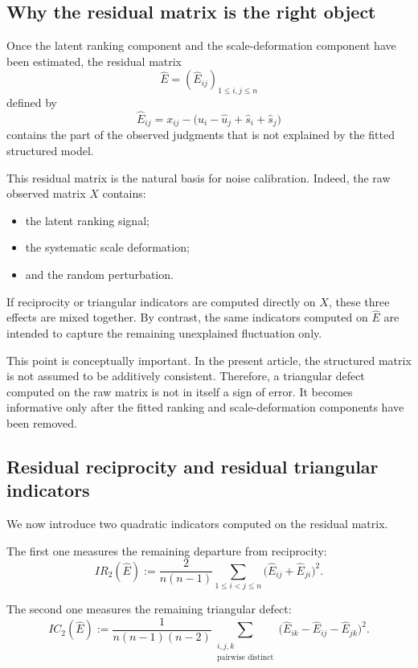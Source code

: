 \documentclass[11pt]{amsart}
\theoremstyle{definition}
\theoremstyle{plain}
\numberwithin{equation}{section}
\begin{document}
\subsection{Why the residual matrix is the right object}

Once the latent ranking component and the scale-deformation component have been estimated, the residual matrix
\[
\widehat E=(\widehat E_{ij})_{1\leq i,j\leq n}
\]
defined by
\[
\widehat E_{ij}
=
x_{ij}
-
\bigl(\widehat u_i-\widehat u_j+\widehat s_i+\widehat s_j\bigr)
\]
contains the part of the observed judgments that is not explained by the fitted structured model.

This residual matrix is the natural basis for noise calibration. Indeed, the raw observed matrix $X$ contains:
\begin{itemize}
\item the latent ranking signal;
\item the systematic scale deformation;
\item and the random perturbation.
\end{itemize}
If reciprocity or triangular indicators are computed directly on $X$, these three effects are mixed together. By contrast, the same indicators computed on $\widehat E$ are intended to capture the remaining unexplained fluctuation only.

This point is conceptually important. In the present article, the structured matrix is not assumed to be additively consistent. Therefore, a triangular defect computed on the raw matrix is not in itself a sign of error. It becomes informative only after the fitted ranking and scale-deformation components have been removed.

\subsection{Residual reciprocity and residual triangular indicators}

We now introduce two quadratic indicators computed on the residual matrix.

The first one measures the remaining departure from reciprocity:
\begin{equation}\label{eq:IR2corr}
IR_2(\widehat E)
:=
\frac{2}{n(n-1)}
\sum_{1\leq i<j\leq n}
\bigl(\widehat E_{ij}+\widehat E_{ji}\bigr)^2.
\end{equation}

The second one measures the remaining triangular defect:
\begin{equation}\label{eq:IC2corr}
IC_2(\widehat E)
:=
\frac{1}{n(n-1)(n-2)}
\sum_{\substack{i,j,k\\ \text{pairwise distinct}}}
\bigl(\widehat E_{ik}-\widehat E_{ij}-\widehat E_{jk}\bigr)^2.
\end{equation}
\end{document}
